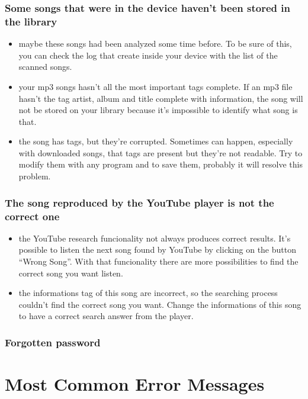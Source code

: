 \subsection*{Some songs that were in the device haven't been stored in the
library}
\begin{itemize}
  \item maybe these songs had been analyzed some time before. To be sure of
  this, you can check the log that  create inside your device with
  the list of the scanned songs.
  \item your mp3 songs hasn't all the most important tags complete. If an mp3
  file hasn't the tag artist, album and title complete with information, the
  song will not be stored on your library because it's impossible to identify
  what song is that.
  \item the song has tags, but they're corrupted. Sometimes can happen, especially
  with downloaded songs, that tags are present but they're not readable. Try to 
  modify them with any program and to save them, probably it will resolve this problem.
\end{itemize}

\subsection*{The song reproduced by the YouTube player is not the correct one}
\begin{itemize}
  \item the YouTube research funcionality not always produces correct results.
  It's possible to listen the next song found by YouTube by clicking on the button
  ``Wrong Song''. With that funcionality there are more possibilities to find
  the correct song you want listen.
  \item the informations tag of this song are incorrect, so the searching
  process couldn't find the correct song you want. Change the informations of
  this song to have a correct search answer from the player.
\end{itemize}

\subsection*{Forgotten password}

\appendix %
\chapter{Most Common Error Messages}
\thispagestyle{fancy}

